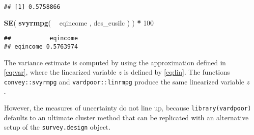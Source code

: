 \documentclass[]{book}
\newenvironment{Shaded}{\begin{snugshade}}{\end{snugshade}}
\newcommand{\DecValTok}[1]{\textcolor[rgb]{0.00,0.00,0.81}{#1}}
\newcommand{\KeywordTok}[1]{\textcolor[rgb]{0.13,0.29,0.53}{\textbf{#1}}}
\newcommand{\NormalTok}[1]{#1}
\newcommand{\OperatorTok}[1]{\textcolor[rgb]{0.81,0.36,0.00}{\textbf{#1}}}
\newcommand{\StringTok}[1]{\textcolor[rgb]{0.31,0.60,0.02}{#1}}
\begin{document}
\begin{verbatim}
## [1] 0.5758866
\end{verbatim}

\begin{Shaded}
\begin{Highlighting}[]
\KeywordTok{SE}\NormalTok{( }\KeywordTok{svyrmpg}\NormalTok{( }\OperatorTok{~}\StringTok{ }\NormalTok{eqincome , des_eusilc ) ) }\OperatorTok{*}\StringTok{ }\DecValTok{100}
\end{Highlighting}
\end{Shaded}

\begin{verbatim}
##           eqincome
## eqincome 0.5763974
\end{verbatim}

The variance estimate is computed by using the approximation defined in \eqref{eq:var}, where the linearized variable \(z\) is defined by \eqref{eq:lin}. The functions \texttt{convey::svyrmpg} and \texttt{vardpoor::linrmpg} produce the same linearized variable \(z\).

However, the measures of uncertainty do not line up, because \texttt{library(vardpoor)} defaults to an ultimate cluster method that can be replicated with an alternative setup of the \texttt{survey.design} object.
\end{document}
